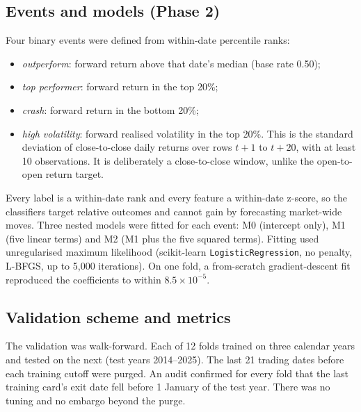 \documentclass[11pt]{article}
\begin{document}
\subsection{Events and models (Phase 2)}
Four binary events were defined from within-date percentile ranks:
\begin{itemize}
\item \emph{outperform}: forward return above that date's median (base rate 0.50);
\item \emph{top performer}: forward return in the top 20\%;
\item \emph{crash}: forward return in the bottom 20\%;
\item \emph{high volatility}: forward realised volatility in the top 20\%. This is the standard deviation of close-to-close daily returns over rows $t+1$ to $t+20$, with at least 10 observations. It is deliberately a close-to-close window, unlike the open-to-open return target.
\end{itemize}
Every label is a within-date rank and every feature a within-date z-score, so the classifiers target relative outcomes and cannot gain by forecasting market-wide moves. Three nested models were fitted for each event: M0 (intercept only), M1 (five linear terms) and M2 (M1 plus the five squared terms). Fitting used unregularised maximum likelihood (scikit-learn \texttt{LogisticRegression}, no penalty, L-BFGS, up to 5,000 iterations). On one fold, a from-scratch gradient-descent fit reproduced the coefficients to within $8.5\times10^{-5}$.

\subsection{Validation scheme and metrics}
The validation was walk-forward. Each of 12 folds trained on three calendar years and tested on the next (test years 2014--2025). The last 21 trading dates before each training cutoff were purged. An audit confirmed for every fold that the last training card's exit date fell before 1 January of the test year. There was no tuning and no embargo beyond the purge.
\end{document}
